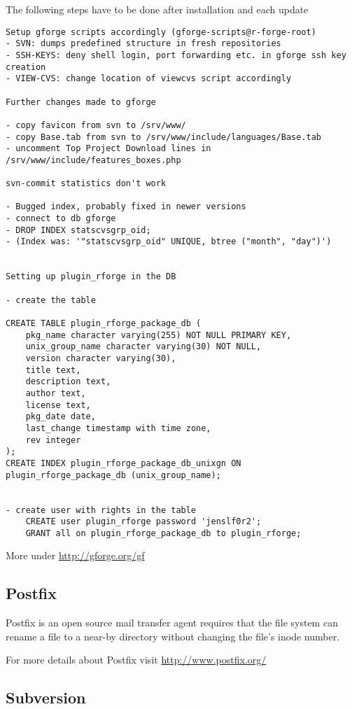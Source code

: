 \documentclass[a4paper]{article}
\begin{document}
The following steps have to be done after installation and each update
\begin{lstlisting}
Setup gforge scripts accordingly (gforge-scripts@r-forge-root)
- SVN: dumps predefined structure in fresh repositories
- SSH-KEYS: deny shell login, port forwarding etc. in gforge ssh key creation
- VIEW-CVS: change location of viewcvs script accordingly

Further changes made to gforge

- copy favicon from svn to /srv/www/
- copy Base.tab from svn to /srv/www/include/languages/Base.tab
- uncomment Top Project Download lines in /srv/www/include/features_boxes.php 

svn-commit statistics don't work

- Bugged index, probably fixed in newer versions
- connect to db gforge
- DROP INDEX statscvsgrp_oid;
- (Index was: '"statscvsgrp_oid" UNIQUE, btree ("month", "day")')


Setting up plugin_rforge in the DB

- create the table

CREATE TABLE plugin_rforge_package_db (
    pkg_name character varying(255) NOT NULL PRIMARY KEY,
    unix_group_name character varying(30) NOT NULL,
    version character varying(30),
    title text,
    description text,
    author text,
    license text,
    pkg_date date,
    last_change timestamp with time zone,
    rev integer
);
CREATE INDEX plugin_rforge_package_db_unixgn ON plugin_rforge_package_db (unix_group_name);


- create user with rights in the table
    CREATE user plugin_rforge password 'jenslf0r2';
    GRANT all on plugin_rforge_package_db to plugin_rforge;
\end{lstlisting}
\par More under \url{http://gforge.org/gf}

\subsection{Postfix}
Postfix is an open source mail transfer agent requires that the file system can rename a file to a near-by
directory without changing the file's inode number.

For more details about Postfix visit \url{http://www.postfix.org/}

\subsection{Subversion}
\end{document}
